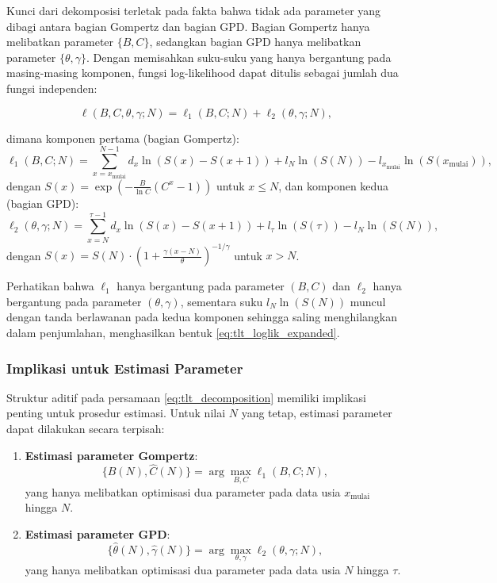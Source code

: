 Kunci dari dekomposisi terletak pada fakta bahwa tidak ada parameter yang dibagi antara bagian Gompertz dan bagian GPD. Bagian Gompertz hanya melibatkan parameter $\{B, C\}$, sedangkan bagian GPD hanya melibatkan parameter $\{\theta, \gamma\}$. Dengan memisahkan suku-suku yang hanya bergantung pada masing-masing komponen, fungsi log-likelihood dapat ditulis sebagai jumlah dua fungsi independen:

\begin{equation}
\ell(B, C, \theta, \gamma; N) = \ell_1(B, C; N) + \ell_2(\theta, \gamma; N),
\label{eq:tlt_decomposition}
\end{equation}

dimana komponen pertama (bagian Gompertz):
\begin{equation}
\ell_1(B, C; N) = \sum_{x=x_{\text{mulai}}}^{N-1} d_x \ln(S(x) - S(x+1)) + l_N \ln(S(N)) - l_{x_{\text{mulai}}} \ln(S(x_{\text{mulai}})),
\label{eq:tlt_gompertz_loglik}
\end{equation}
dengan $S(x) = \exp\left(-\frac{B}{\ln C}(C^x - 1)\right)$ untuk $x \leq N$, dan komponen kedua (bagian GPD):
\begin{equation}
\ell_2(\theta, \gamma; N) = \sum_{x=N}^{\tau-1} d_x \ln(S(x) - S(x+1)) + l_\tau \ln(S(\tau)) - l_N \ln(S(N)),
\label{eq:tlt_gpd_loglik}
\end{equation}
dengan $S(x) = S(N) \cdot \left(1 + \frac{\gamma(x-N)}{\theta}\right)^{-1/\gamma}$ untuk $x > N$.

Perhatikan bahwa $\ell_1$ hanya bergantung pada parameter $(B, C)$ dan $\ell_2$ hanya bergantung pada parameter $(\theta, \gamma)$, sementara suku $l_N \ln(S(N))$ muncul dengan tanda berlawanan pada kedua komponen sehingga saling menghilangkan dalam penjumlahan, menghasilkan bentuk \eqref{eq:tlt_loglik_expanded}.

\subsubsection{Implikasi untuk Estimasi Parameter}

Struktur aditif pada persamaan \eqref{eq:tlt_decomposition} memiliki implikasi penting untuk prosedur estimasi. Untuk nilai $N$ yang tetap, estimasi parameter dapat dilakukan secara terpisah:

\begin{enumerate}
    \item \textbf{Estimasi parameter Gompertz}: 
    \begin{equation}
    \{\hat{B}(N), \hat{C}(N)\} = \arg\max_{B,C} \ell_1(B, C; N),
    \label{eq:mle_gompertz}
    \end{equation}
    yang hanya melibatkan optimisasi dua parameter pada data usia $x_{\text{mulai}}$ hingga $N$.
    
    \item \textbf{Estimasi parameter GPD}: 
    \begin{equation}
    \{\hat{\theta}(N), \hat{\gamma}(N)\} = \arg\max_{\theta,\gamma} \ell_2(\theta, \gamma; N),
    \label{eq:mle_gpd}
    \end{equation}
    yang hanya melibatkan optimisasi dua parameter pada data usia $N$ hingga $\tau$.
\end{enumerate}


